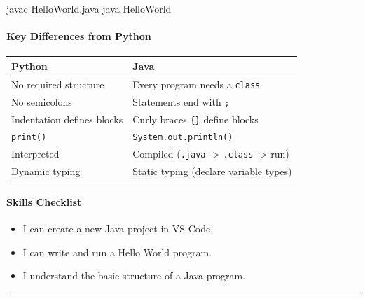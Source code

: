 \documentclass[
  justified,
  openright,
]{tufte-book}
\let\subsection\paragraph
\let\paragraph\paragraph
\newenvironment{Shaded}{%
  \begin{mdframed}[style=TufteCode]%
}{%
  \end{mdframed}%
}
\let\subsection\paragraph
\let\paragraph\paragraph
\providecommand{\tightlist}{%
  \setlength{\itemsep}{0pt}\setlength{\parskip}{0pt}}
\begin{document}
\begin{Shaded}
\begin{Highlighting}[]
javac HelloWorld.java
java HelloWorld
\end{Highlighting}
\end{Shaded}

\subsection{Key Differences from
Python}\label{key-differences-from-python-1}

\begin{fullwidth}{\def\LTcaptype{none} %
\begin{longtable}[]{@{}ll@{}}
\toprule\noalign{}
Python & Java \\
\midrule\noalign{}
\endhead
\bottomrule\noalign{}
\endlastfoot
No required structure & Every program needs a \texttt{class} \\
No semicolons & Statements end with \texttt{;} \\
Indentation defines blocks & Curly braces \texttt{\{\}} define blocks \\
\texttt{print()} & \texttt{System.out.println()} \\
Interpreted & Compiled (\texttt{.java} -\textgreater{} \texttt{.class}
-\textgreater{} run) \\
Dynamic typing & Static typing (declare variable types) \\
\end{longtable}
}
\end{fullwidth}

\subsection{Skills Checklist}\label{skills-checklist-69}

\begin{itemize}
\tightlist
\item[$\square$]
  I can create a new Java project in VS Code.
\item[$\square$]
  I can write and run a Hello World program.
\item[$\square$]
  I understand the basic structure of a Java program.
\end{itemize}

\begin{center}\rule{0.5\linewidth}{0.5pt}\end{center}
\end{document}
